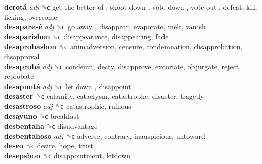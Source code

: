 \textbf{derotá} \emph{adj}  ␝ϲ   get the better of ,  shoot down ,  vote down ,  vote out , defeat, kill, licking, overcome  \\
\textbf{desaparesé} \emph{adj}  ␝ϲ   go away , disappear, evaporate, melt, vanish  \\
\textbf{desaparishon} ␝ϲ  disappearance, disappearing, fade  \\
\textbf{desaprobashon} ␝ϲ  animadversion, censure, condemnation, disapprobation, disapproval  \\
\textbf{desaprobá} \emph{adj}  ␝ϲ  condemn, decry, disapprove, excoriate, objurgate, reject, reprobate  \\
\textbf{desapuntá} \emph{adj}  ␝ϲ   let down , disappoint  \\
\textbf{desaster} ␝ϲ  calamity, cataclysm, catastrophe, disaster, tragedy  \\
\textbf{desastroso} \emph{adj}  ␝ϲ  catastrophic, ruinous  \\
\textbf{desayuno} ␝ϲ  breakfast  \\
\textbf{desbentaha} ␝ϲ  disadvantage  \\
\textbf{desbentahoso} \emph{adj}  ␝ϲ  adverse, contrary, inauspicious, untoward  \\
\textbf{deseo} ␝ϲ  desire, hope, trust  \\
\textbf{desepshon} ␝ϲ  disappointment, letdown  \\
